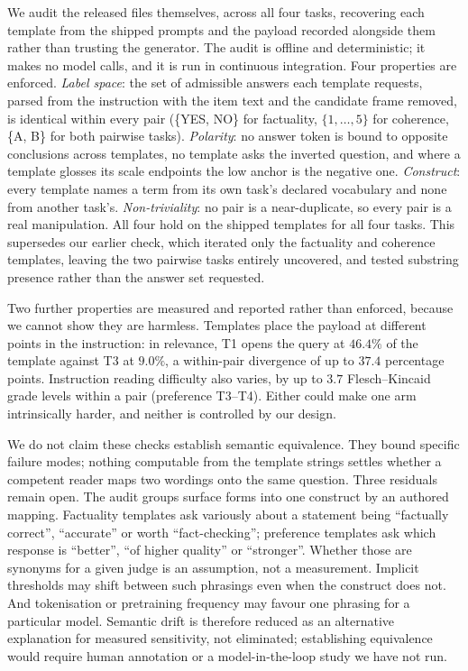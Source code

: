\documentclass[11pt]{article}          %
\begin{document}
We audit the released files themselves, across all four tasks, recovering each
template from the shipped prompts and the payload recorded alongside them rather
than trusting the generator. The audit is offline and deterministic;
it makes no model calls, and it is run in continuous integration. Four
properties are enforced. \emph{Label space}: the set of admissible answers each
template requests, parsed from the instruction with the item text and the
candidate frame removed, is identical within every pair (\{YES, NO\} for
factuality, $\{1,\dots,5\}$ for coherence, \{A, B\} for both pairwise tasks).
\emph{Polarity}: no answer token is bound to opposite conclusions across
templates, no template asks the inverted question, and where a template glosses
its scale endpoints the low anchor is the negative one. \emph{Construct}: every
template names a term from its own task's declared vocabulary and none from
another task's. \emph{Non-triviality}: no pair is a near-duplicate, so every
pair is a real manipulation. All four hold on the shipped templates for all four
tasks. This supersedes our earlier check, which iterated only the factuality and
coherence templates, leaving the two pairwise tasks entirely uncovered, and
tested substring presence rather than the answer set requested.

Two further properties are measured and reported rather than enforced, because
we cannot show they are harmless. Templates place the payload at different
points in the instruction: in relevance, T1 opens the query at $46.4\%$ of the
template against T3 at $9.0\%$, a within-pair divergence of up to $37.4$
percentage points. Instruction reading difficulty also varies, by up to $3.7$
Flesch--Kincaid grade levels within a pair (preference T3--T4). Either could
make one arm intrinsically harder, and neither is controlled by our design.

We do not claim these checks establish semantic equivalence. They bound specific
failure modes; nothing computable from the template strings settles whether a
competent reader maps two wordings onto the same question. Three residuals
remain open. The audit groups surface forms into one construct by an authored mapping.
Factuality templates ask variously about a statement being ``factually
correct'', ``accurate'' or worth ``fact-checking''; preference templates ask
which response is ``better'', ``of higher quality'' or ``stronger''. Whether
those are synonyms for a given judge is an assumption, not a measurement. Implicit thresholds may shift between such
phrasings even when the construct does not. And tokenisation or pretraining
frequency may favour one phrasing for a particular model. Semantic drift is
therefore reduced as an alternative explanation for measured sensitivity, not
eliminated; establishing equivalence would require human annotation or a
model-in-the-loop study we have not run.
\end{document}

